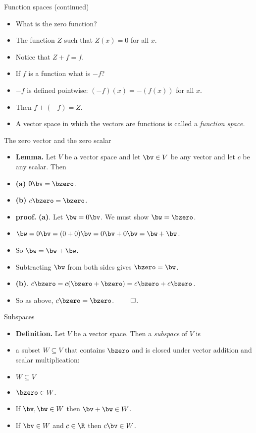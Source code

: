 \documentclass{beamer}
\begin{document}
\begin{frame}{Function spaces (continued)}

\begin{itemize}
\item What is the zero function?
\item The function $Z$ such that $Z(x) = 0$ for all $x$.
\item Notice that $Z + f = f$.
\item If $f$ is a function what is $-f$?
\item $-f$ is defined pointwise: $(-f)(x)  = -(f(x))$ for all $x$.
\item Then $f+(-f) = Z$.
\item A vector space in which the vectors are functions is called
a \emph{function space.}
\end{itemize}
\end{frame}

\begin{frame}{The zero vector and the zero scalar}

\begin{itemize}
\item \textbf{Lemma.} Let $V$ be a vector space and let $\bv \in V$ be
any vector and let $c$ be any scalar. Then
\item \textbf{(a)} $0 \bv = \bzero$.
\item \textbf{(b)} $c \bzero = \bzero$.
\item \textbf{proof.} \textbf{(a)}. Let $\bw = 0\bv$. We must show $\bw=\bzero$.
\item $\bw = 0\bv = (0+0)\bv = 0\bv + 0\bv = \bw+\bw$.
\item So $\bw = \bw + \bw$.
\item Subtracting $\bw$ from both sides gives $\bzero = \bw$.
\item \textbf{(b)}. $c\bzero = c(\bzero + \bzero) = c\bzero + c\bzero$.
\item So as above, $c\bzero = \bzero$. $\qed$.
\end{itemize}
\end{frame}

\begin{frame}{Subspaces}

\begin{itemize}
\item \textbf{Definition.} Let $V$ be a vector space. Then a \emph{subspace}
of $V$ is
\item  a subset $W\subseteq V$ that contains $\bzero$ and is closed
under vector addition and scalar multiplication:
\item $W\subseteq V$
\item $\bzero \in W$.
\item If $\bv,\bw\in W$ then $\bv+\bw\in W$.
\item If $\bv\in W$ and $c\in \R$ then $c\bv\in W$.
\end{itemize}
\end{frame}
\end{document}
